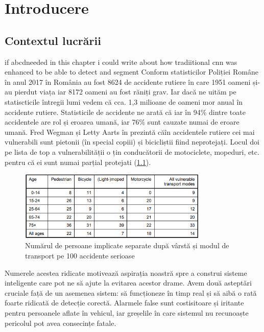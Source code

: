 
\chapter{Introducere}
\label{cap:Introducere}
 \section{Contextul lucrării}
if abcdneeded in this chapter i could write about how tradiitional cnn was enhanced to be able to detect and segment \newline
Conform statisticilor Poliției Române \cite{politia_romana}  în anul 2017 în România au fost 8624 de accidente rutiere în care 1951 oameni și-au pierdut viața iar 8172 oameni au fost răniți grav. Iar dacă ne uităm pe statiscticile întregii lumi \cite{WHO}  vedem că cca. 1,3 milioane de oameni mor anual în accidente rutiere.\newline
Statisticile de accidente ne arată că iar în 94\% dintre toate accidentele are rol și eroarea umană, iar 76\% sunt cauzate numai de eroare umană.
 Fred Wegman și Letty Aarts  în \cite{SWOV} prezintă căîn accidentele rutiere cei mai vulnerabili sunt pietonii (în special copiii) și bicicliștii fiind neprotejați. Locul doi pe lista de top a vulnerabilității o țin conducătorii de motociclete, mopeduri, etc. pentru că ei sunt numai parțial protejati (\ref{fig:lethalities}).\newline
\begin{figure}[h!]
    	\centering
	\captionsetup{justification=centering, margin=2cm}
	\includegraphics[width=0.8\textwidth]{figures/lethality_rates.png}
	\caption{Numărul de persoane implicate separate după vârstă și modul de transport pe 100 accidente serioase \cite{SWOV}}
	\label{fig:lethalities}
\end{figure}
Numerele acestea ridicate motivează aspirația noastră spre a construi sisteme inteligente care pot ne să ajute la evitarea acestor drame. Avem două asteptări cruciale față de un asemenea sistem: să funcționeze în timp real și să aibă o rată foarte ridicată de detecție corectă. Alarmele false sunt costisitoare și iritante pentru persoanele aflate în vehicul, iar greșelile în care sistemul nu recunoaște pericolul pot avea consecințe fatale.\newline
